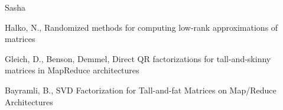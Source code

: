 \documentclass[12pt,fleqn]{article}\usepackage{../../common}
\begin{document}
Sasha 

Halko, N., Randomized methods for computing low-rank approximations of matrices

Gleich, D., Benson, Demmel, Direct QR factorizations for tall-and-skinny matrices in MapReduce architectures

Bayramli, B., SVD Factorization for Tall-and-fat Matrices on Map/Reduce Architectures
\end{document}
